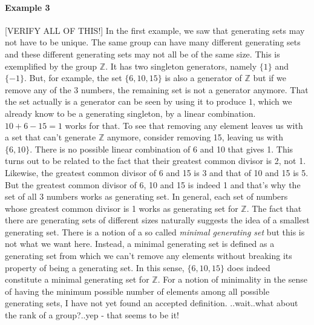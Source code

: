 \paragraph{Example 3} [VERIFY ALL OF THIS!] In the first example, we saw that generating sets may not have to be unique. The same group can have many different generating sets and these different generating sets may not all be of the same size. This is exemplified by the group $\mathbb{Z}$. It has two singleton generators, namely $\{1\}$ and $\{-1\}$. But, for example, the set $\{6,10,15\}$ is also a generator of $\mathbb{Z}$ but if we remove any of the 3 numbers, the remaining set is not a generator anymore. That the set actually is a generator can be seen by using it to produce $1$, which we already know to be a generating singleton, by a linear combination. $10 + 6 - 15 = 1$ works for that. To see that removing any element leaves us with a set that can't generate  $\mathbb{Z}$ anymore, consider removing 15, leaving us with $\{6,10\}$. There is no possible linear combination of 6 and 10 that gives 1. This turns out to be related to the fact that their greatest common divisor is 2, not 1. Likewise, the greatest common divisor of 6 and 15 is 3 and that of 10 and 15 is 5. But the greatest common divisor of 6, 10 and 15 is indeed 1 and that's why the set of all 3 numbers works as generating set. In general, each set of numbers whose greatest common divisor is 1 works as generating set for $\mathbb{Z}$. The fact that there are generating sets of different sizes naturally suggests the idea of a smallest generating set. There is a notion of a so called \emph{minimal generating set} but this is not what we want here. Instead, a minimal generating set is defined as a generating set from which we can't remove any elements without breaking its property of being a generating set. In this sense, $\{6,10,15\}$ does indeed constitute a minimal generating set for $\mathbb{Z}$. For a notion of minimality in the sense of having the minimum possible number of elements among all possible generating sets, I have not yet found an accepted definition. ..wait..what about the rank of a group?..yep - that seems to be it!



